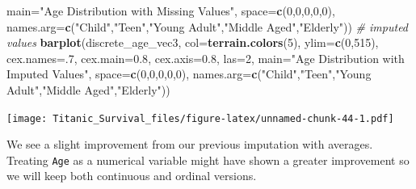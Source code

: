 \documentclass[]{article}
\newenvironment{Shaded}{\begin{snugshade}}{\end{snugshade}}
\newcommand{\KeywordTok}[1]{\textcolor[rgb]{0.13,0.29,0.53}{\textbf{#1}}}
\newcommand{\DataTypeTok}[1]{\textcolor[rgb]{0.13,0.29,0.53}{#1}}
\newcommand{\DecValTok}[1]{\textcolor[rgb]{0.00,0.00,0.81}{#1}}
\newcommand{\FloatTok}[1]{\textcolor[rgb]{0.00,0.00,0.81}{#1}}
\newcommand{\StringTok}[1]{\textcolor[rgb]{0.31,0.60,0.02}{#1}}
\newcommand{\CommentTok}[1]{\textcolor[rgb]{0.56,0.35,0.01}{\textit{#1}}}
\newcommand{\NormalTok}[1]{#1}
\begin{document}
\begin{Shaded}
\begin{Highlighting}[]
        \DataTypeTok{main=}\StringTok{"Age Distribution with Missing Values"}\NormalTok{,  }\DataTypeTok{space=}\KeywordTok{c}\NormalTok{(}\DecValTok{0}\NormalTok{,}\DecValTok{0}\NormalTok{,}\DecValTok{0}\NormalTok{,}\DecValTok{0}\NormalTok{,}\DecValTok{0}\NormalTok{),}
        \DataTypeTok{names.arg=}\KeywordTok{c}\NormalTok{(}\StringTok{"Child"}\NormalTok{,}\StringTok{"Teen"}\NormalTok{,}\StringTok{"Young Adult"}\NormalTok{,}\StringTok{"Middle Aged"}\NormalTok{,}\StringTok{"Elderly"}\NormalTok{))}
\CommentTok{# imputed values}
\KeywordTok{barplot}\NormalTok{(discrete_age_vec3, }\DataTypeTok{col=}\KeywordTok{terrain.colors}\NormalTok{(}\DecValTok{5}\NormalTok{), }\DataTypeTok{ylim=}\KeywordTok{c}\NormalTok{(}\DecValTok{0}\NormalTok{,}\DecValTok{515}\NormalTok{),}
        \DataTypeTok{cex.names=}\NormalTok{.}\DecValTok{7}\NormalTok{, }\DataTypeTok{cex.main=}\FloatTok{0.8}\NormalTok{, }\DataTypeTok{cex.axis=}\FloatTok{0.8}\NormalTok{, }\DataTypeTok{las=}\DecValTok{2}\NormalTok{,}
        \DataTypeTok{main=}\StringTok{"Age Distribution with Imputed Values"}\NormalTok{,  }\DataTypeTok{space=}\KeywordTok{c}\NormalTok{(}\DecValTok{0}\NormalTok{,}\DecValTok{0}\NormalTok{,}\DecValTok{0}\NormalTok{,}\DecValTok{0}\NormalTok{,}\DecValTok{0}\NormalTok{),}
        \DataTypeTok{names.arg=}\KeywordTok{c}\NormalTok{(}\StringTok{"Child"}\NormalTok{,}\StringTok{"Teen"}\NormalTok{,}\StringTok{"Young Adult"}\NormalTok{,}\StringTok{"Middle Aged"}\NormalTok{,}\StringTok{"Elderly"}\NormalTok{))}
\end{Highlighting}
\end{Shaded}

\texttt{[image: Titanic\_Survival\_files/figure-latex/unnamed-chunk-44-1.pdf]}

We see a slight improvement from our previous imputation with averages.
Treating \texttt{Age} as a numerical variable might have shown a greater
improvement so we will keep both continuous and ordinal versions.
\end{document}
